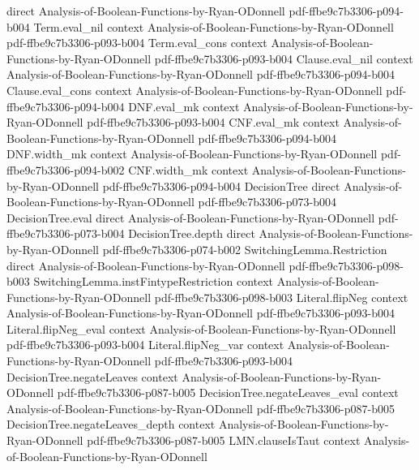 \begin{lemma}
  {direct}
  {Analysis-of-Boolean-Functions-by-Ryan-ODonnell}
  {pdf-ffbe9c7b3306-p094-b004}
\proofstep
  {Term.eval_nil}
  {context}
  {Analysis-of-Boolean-Functions-by-Ryan-ODonnell}
  {pdf-ffbe9c7b3306-p093-b004}
\proofstep
  {Term.eval_cons}
  {context}
  {Analysis-of-Boolean-Functions-by-Ryan-ODonnell}
  {pdf-ffbe9c7b3306-p093-b004}
\proofstep
  {Clause.eval_nil}
  {context}
  {Analysis-of-Boolean-Functions-by-Ryan-ODonnell}
  {pdf-ffbe9c7b3306-p094-b004}
\proofstep
  {Clause.eval_cons}
  {context}
  {Analysis-of-Boolean-Functions-by-Ryan-ODonnell}
  {pdf-ffbe9c7b3306-p094-b004}
\proofstep
  {DNF.eval_mk}
  {context}
  {Analysis-of-Boolean-Functions-by-Ryan-ODonnell}
  {pdf-ffbe9c7b3306-p093-b004}
\proofstep
  {CNF.eval_mk}
  {context}
  {Analysis-of-Boolean-Functions-by-Ryan-ODonnell}
  {pdf-ffbe9c7b3306-p094-b004}
\proofstep
  {DNF.width_mk}
  {context}
  {Analysis-of-Boolean-Functions-by-Ryan-ODonnell}
  {pdf-ffbe9c7b3306-p094-b002}
\proofstep
  {CNF.width_mk}
  {context}
  {Analysis-of-Boolean-Functions-by-Ryan-ODonnell}
  {pdf-ffbe9c7b3306-p094-b004}
\proofstep
  {DecisionTree}
  {direct}
  {Analysis-of-Boolean-Functions-by-Ryan-ODonnell}
  {pdf-ffbe9c7b3306-p073-b004}
\proofstep
  {DecisionTree.eval}
  {direct}
  {Analysis-of-Boolean-Functions-by-Ryan-ODonnell}
  {pdf-ffbe9c7b3306-p073-b004}
\proofstep
  {DecisionTree.depth}
  {direct}
  {Analysis-of-Boolean-Functions-by-Ryan-ODonnell}
  {pdf-ffbe9c7b3306-p074-b002}
\proofstep
  {SwitchingLemma.Restriction}
  {direct}
  {Analysis-of-Boolean-Functions-by-Ryan-ODonnell}
  {pdf-ffbe9c7b3306-p098-b003}
\proofstep
  {SwitchingLemma.instFintypeRestriction}
  {context}
  {Analysis-of-Boolean-Functions-by-Ryan-ODonnell}
  {pdf-ffbe9c7b3306-p098-b003}
\proofstep
  {Literal.flipNeg}
  {context}
  {Analysis-of-Boolean-Functions-by-Ryan-ODonnell}
  {pdf-ffbe9c7b3306-p093-b004}
\proofstep
  {Literal.flipNeg_eval}
  {context}
  {Analysis-of-Boolean-Functions-by-Ryan-ODonnell}
  {pdf-ffbe9c7b3306-p093-b004}
\proofstep
  {Literal.flipNeg_var}
  {context}
  {Analysis-of-Boolean-Functions-by-Ryan-ODonnell}
  {pdf-ffbe9c7b3306-p093-b004}
\proofstep
  {DecisionTree.negateLeaves}
  {context}
  {Analysis-of-Boolean-Functions-by-Ryan-ODonnell}
  {pdf-ffbe9c7b3306-p087-b005}
\proofstep
  {DecisionTree.negateLeaves_eval}
  {context}
  {Analysis-of-Boolean-Functions-by-Ryan-ODonnell}
  {pdf-ffbe9c7b3306-p087-b005}
\proofstep
  {DecisionTree.negateLeaves_depth}
  {context}
  {Analysis-of-Boolean-Functions-by-Ryan-ODonnell}
  {pdf-ffbe9c7b3306-p087-b005}
\proofstep
  {LMN.clauseIsTaut}
  {context}
  {Analysis-of-Boolean-Functions-by-Ryan-ODonnell}

\end{lemma}
